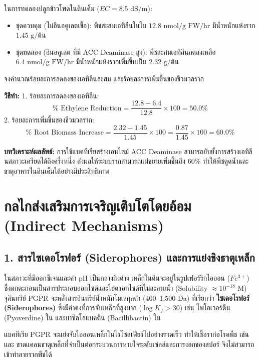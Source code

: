 \begin{worked}
ในการทดลองปลูกข้าวโพดในดินเค็ม ($EC = 8.5\text{ dS/m}$):
\begin{itemize}
    \item ชุดควบคุม (ไม่อินอคูเลตเชื้อ): พืชสะสมเอทิลีนในใบ $12.8\text{ nmol/g FW/hr}$ มีน้ำหนักแห้งราก $1.45\text{ g/ต้น}$
    \item ชุดทดลอง (อินอคูเลต  ที่มี ACC Deaminase สูง): พืชสะสมเอทิลีนลดลงเหลือ $6.4\text{ nmol/g FW/hr}$ มีน้ำหนักแห้งรากเพิ่มขึ้นเป็น $2.32\text{ g/ต้น}$
\end{itemize}
จงคำนวณร้อยละการลดลงของเอทิลีนสะสม และร้อยละการเพิ่มขึ้นของชีวมวลราก

\textbf{วิธีทำ:}
1. ร้อยละการลดลงของเอทิลีน:
$$\% \text{ Ethylene Reduction} = \frac{12.8 - 6.4}{12.8} \times 100 = 50.0\%$$
2. ร้อยละการเพิ่มขึ้นของชีวมวลราก:
$$\% \text{ Root Biomass Increase} = \frac{2.32 - 1.45}{1.45} \times 100 = \frac{0.87}{1.45} \times 100 = 60.0\%$$

\textbf{บทวิเคราะห์ผลลัพธ์:} การใช้แบคทีเรียสร้างเอนไซม์ ACC Deaminase สามารถยับยั้งการสร้างเอทิลีนสภาวะเครียดได้ถึงครึ่งหนึ่ง ส่งผลให้ระบบรากสามารถแผ่ขยายเพิ่มขึ้นถึง 60\% ทำให้พืชดูดน้ำและธาตุอาหารในดินเค็มได้อย่างมีประสิทธิภาพ
\end{worked}

\section{กลไกส่งเสริมการเจริญเติบโตโดยอ้อม (Indirect Mechanisms)}

\subsection{1. สารไซเดอโรฟอร์ (Siderophores) และการแย่งชิงธาตุเหล็ก}

ในสภาวะที่มีออกซิเจนและค่า pH เป็นกลางถึงด่าง เหล็กในดินจะอยู่ในรูปเฟอร์ริกไอออน ($Fe^{3+}$) ซึ่งตกตะกอนเป็นสารประกอบออกไซด์และไฮดรอกไซด์ที่ไม่ละลายน้ำ ($\text{Solubility } \approx 10^{-18}\text{ M}$) จุลินทรีย์ PGPR จะหลั่งสารอินทรีย์น้ำหนักโมเลกุลต่ำ (400--1,500 Da) ที่เรียกว่า \textbf{ไซเดอโรฟอร์ (Siderophores)} ซึ่งมีค่าคงที่การจับเหล็กที่สูงมาก ($\log K_f > 30$) เช่น ไพโอเวอร์ดีน (Pyoverdine) ใน  และบาซิลโลแบคติน (Bacillibactin) ใน 

แบคทีเรีย PGPR จะแย่งจับไอออนเหล็กในไรโซสเฟียร์ไปอย่างรวดเร็ว ทำให้เชื้อราก่อโรคพืช เช่น  และ  ขาดแคลนธาตุเหล็กที่จำเป็นต่อกระบวนการหายใจระดับเซลล์และการงอกของสปอร์ จึงไม่สามารถเข้าทำลายรากพืชได้

